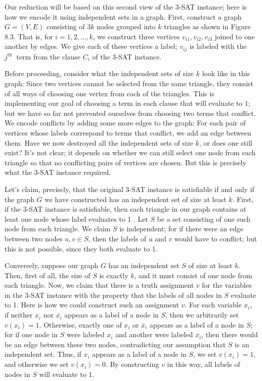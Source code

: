 \documentclass[a4paper, 12pt]{book}
\theoremstyle{dotless}
\begin{document}
Our reduction will be based on this second view of the 3-SAT instance; here is how we encode it using independent sets in a graph. First, construct a graph $G=(V, E)$ consisting of $3 k$ nodes grouped into $k$ triangles as shown in Figure 8.3. That is, for $i=1,2, \ldots, k$, we construct three vertices $v_{i 1}, v_{i 2}, v_{i 3}$ joined to one another by edges. We give each of these vertices a label; $v_{i j}$ is labeled with the $j^{\text {th }}$ term from the clause $C_{i}$ of the 3-SAT instance.

Before proceeding, consider what the independent sets of size $k$ look like in this graph: Since two vertices cannot be selected from the same triangle, they consist of all ways of choosing one vertex from each of the triangles. This is implementing our goal of choosing a term in each clause that will evaluate to 1; but we have so far not prevented ourselves from choosing two terms that conflict. We encode conflicts by adding some more edges to the graph: For each pair of vertices whose labels correspond to terms that conflict, we add an edge between them. Have we now destroyed all the independent sets of size $k$, or does one still exist? It's not clear; it depends on whether we can still select one node from each triangle so that no conflicting pairs of vertices are chosen. But this is precisely what the 3-SAT instance required.

Let's claim, precisely, that the original 3-SAT instance is satisfiable if and only if the graph $G$ we have constructed has an independent set of size at least $k$. First, if the 3-SAT instance is satisfiable, then each triangle in our graph contains at least one node whose label evaluates to 1 . Let $S$ be a set consisting of one such node from each triangle. We claim $S$ is independent; for if there were an edge between two nodes $u, v \in S$, then the labels of $u$ and $v$ would have to conflict; but this is not possible, since they both evaluate to 1.

Conversely, suppose our graph $G$ has an independent set $S$ of size at least $k$. Then, first of all, the size of $S$ is exactly $k$, and it must consist of one node from each triangle. Now, we claim that there is a truth assignment $v$ for the variables in the 3-SAT instance with the property that the labels of all nodes in $S$ evaluate to 1. Here is how we could construct such an assignment $v$. For each variable $x_{i}$, if neither $x_{i}$ nor $\overline{x_{i}}$ appears as a label of a node in $S$, then we arbitrarily set $v\left(x_{i}\right)=1$. Otherwise, exactly one of $x_{i}$ or $\bar{x}_{i}$ appears as a label of a node in $S$; for if one node in $S$ were labeled $x_{i}$ and another were labeled $\overline{x_{i}}$, then there would be an edge between these two nodes, contradicting our assumption that $S$ is an independent set. Thus, if $x_{i}$ appears as a label of a node in $S$, we set $v\left(x_{i}\right)=1$, and otherwise we set $v\left(x_{i}\right)=0$. By constructing $v$ in this way, all labels of nodes in $S$ will evaluate to 1.
\end{document}
